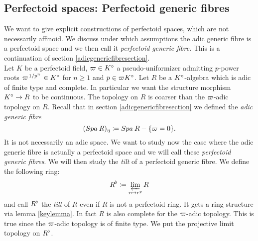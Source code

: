 \subsection{Perfectoid spaces: Perfectoid generic fibres}

We want to give explicit constructions of perfectoid spaces, which are not necessarily affinoid. We discuss under which assumptions the adic generic fibre is a perfectoid space and we then call it \emph{perfectoid generic fibre}. This is a continuation of section \ref{adicgenericfibresection}.\\

Let $K$ be a perfectoid field, $\varpi\in K{^{\circ}}$ a pseudo-uniformizer admitting $p$-power roots $\varpi^{\left.1\middle/p^n\right.}\in K{^{\circ}}$ for $n\geq1$ and $p\in\varpi K{^{\circ}}$. Let $R$ be a $K{^{\circ}}$-algebra which is adic of finite type and complete. In particular we want the structure morphism $K{^{\circ}}\to R$ to be continuous.
The topology on $R$ is coarser than the $\varpi$-adic topology on $R$.
Recall that in section \ref{adicgenericfibresection} we defined the \emph{adic generic fibre} 
\[({Spa{\:R}})_{\eta} \coloneqq {Spa{\:R}}-\{\varpi=0\}.\] It is not necessarily an adic space. We want to study now the case where the adic generic fibre is actually a perfectoid space and we will call these \emph{perfectoid generic fibres}. 
We will then study the \emph{tilt} of a perfectoid generic fibre.
We define the following ring:
\[R^{\flat}\coloneqq \varprojlim_{r\mapsto r^p}R\]
and call $R^{\flat}$ the \emph{tilt} of $R$ even if $R$ is not a perfectoid ring. It gets a ring structure via lemma \ref{keylemma}. %
In fact $R$ is also complete for the $\varpi$-adic topology. This is true since the $\varpi$-adic topology is of finite type.
We put the projective limit topology on $R^{\flat}$.


